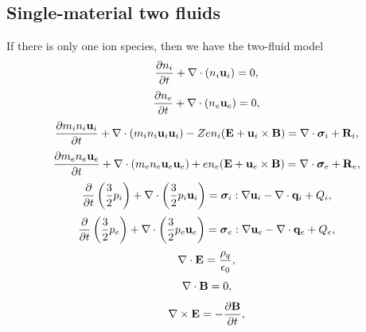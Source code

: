 \documentclass[a4paper,11pt]{report}
\begin{document}
\subsection{Single-material two fluids}
If there is only one ion species, then we have the two-fluid model
\label{sec:mf_2fluid_equations}
\begin{equation}
    \label{eq:mf_2fluid_ni}
    \frac{\partial n_i}{\partial t} + \nabla \cdot \left ( n_i \mathbf{u}_i \right ) = 0,
\end{equation}
\begin{equation}
    \label{eq:mf_2fluid_ne}
    \frac{\partial n_e}{\partial t} + \nabla \cdot \left ( n_e \mathbf{u}_e \right ) = 0,
\end{equation}
\begin{equation}
    \label{eq:mf_2fluid_ui}
    \frac{\partial m_i n_i \mathbf{u}_i}{\partial t} + \nabla \cdot \left ( m_i n_i \mathbf{u}_i \mathbf{u}_i \right) - Z e n_i ( \mathbf{E} + \mathbf{u}_i \times \mathbf{B} ) = \nabla \cdot \bm \sigma_i + \mathbf{R}_i,
\end{equation}
\begin{equation}
    \label{eq:mf_2fluid_ue}
    \frac{\partial m_e n_e \mathbf{u}_e}{\partial t} + \nabla \cdot \left ( m_e n_e \mathbf{u}_e \mathbf{u}_e \right) + e n_e ( \mathbf{E} + \mathbf{u}_e \times \mathbf{B} ) = \nabla \cdot \bm \sigma_e + \mathbf{R}_e,
\end{equation}
\begin{equation}
    \label{eq:mf_2fluid_iei}
    \frac{\partial}{\partial t} \left ( \frac{3}{2} p_i \right ) + \nabla \cdot \left ( \frac{3}{2} p_i \mathbf{u}_i \right ) = \bm \sigma_i : \nabla \mathbf{u}_i - \nabla \cdot \mathbf{q}_i + Q_i,
\end{equation}
\begin{equation}
    \label{eq:mf_2fluid_iee}
    \frac{\partial}{\partial t} \left ( \frac{3}{2} p_e \right ) + \nabla \cdot \left ( \frac{3}{2} p_e \mathbf{u}_e \right ) = \bm \sigma_e : \nabla \mathbf{u}_e - \nabla \cdot \mathbf{q}_e + Q_e,
\end{equation}
\begin{equation}
    \label{eq:mf_2fluid_maxwell_3}
    \nabla \cdot \mathbf{E} = \frac{\rho_q}{\epsilon_0},
\end{equation}
\begin{equation}
    \label{eq:mf_2fluid_maxwell_4}
    \nabla \cdot \mathbf{B} = 0,
\end{equation}
\begin{equation}
    \label{eq:mf_2fluid_maxwell_1}
    \nabla \times \mathbf{E} = -\frac{ \partial \mathbf{B}}{\partial t},
\end{equation}
\end{document}
